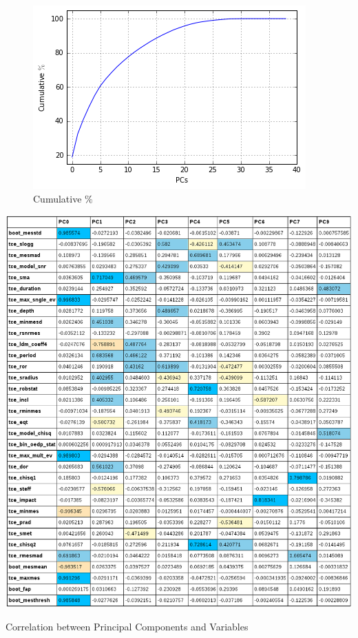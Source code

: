 \begin{figure}[!h]
\begin{center}
        \includegraphics[width=0.4\textheight]{img/pca_cumulative.png}
        \caption{Cumulative $\%$}  \label{fig:pca_cumulative}
\end{center}
\end{figure}

\begin{table}
\begin{center}
        \includegraphics[width=0.75\textheight]{img/pc_corr.png}
        \caption{Correlation between Principal Components and Variables}  \label{fig:pc_corr}
\end{center}
\end{table}


